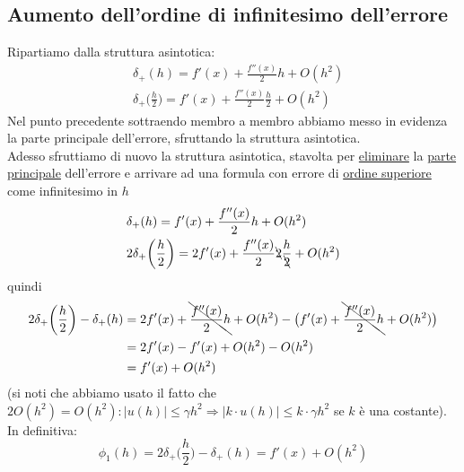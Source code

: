 \documentclass[12pt,a4paper]{article}
\begin{document}
\subsection{Aumento dell'ordine di infinitesimo dell'errore}
Ripartiamo dalla struttura asintotica:
\begin{equation*}
    \begin{split}
        & \delta_+(h) = f'(x) + \frac{f''(x)}{2}h + O(h^2) \\
        & \delta_+\biggl(\frac{h}{2}\biggr) = f'(x) + \frac{f''(x)}{2}\frac{h}{2} + O(h^2)
    \end{split}
\end{equation*}
Nel punto precedente sottraendo membro a membro abbiamo messo in evidenza la parte principale dell'errore, sfruttando la struttura asintotica.\\
Adesso sfruttiamo di nuovo la struttura asintotica, stavolta
per \uline{eliminare} la \uline{parte principale} dell'errore e arrivare ad una formula con errore di \uline{ordine superiore} come infinitesimo in $h$
\begin{equation*}
    \begin{split}
        & \delta_+(h) = f'(x) + \frac{f''(x)}{2}h + O(h^2) \\
        & 2\delta_+\biggl(\frac{h}{2}\biggr) = 2f'(x) + \frac{f''(x)}{2}\bcancel{2}\frac{h}{\bcancel{2}} + O(h^2)
    \end{split}
\end{equation*}
quindi
\begin{equation*}
    \begin{split}
        2\delta_+ \biggl(\frac{h}{2}\biggr) - \delta_+(h) & = 2f'(x)+\bcancel{\frac{f''(x)}{2}h} + O(h^2) - \bigl(f'(x) + \bcancel{\frac{f''(x)}{2}h} + O(h^2) \bigr) \\
        & = 2f'(x) - f'(x) + O(h^2) - O(h^2) \\
        & = f'(x)+O(h^2)
    \end{split}
\end{equation*}
(si noti che abbiamo usato il fatto che $2O(h^2) = O(h^2) : |u(h)|\leq\gamma h^2 \Rightarrow |k\cdot u(h)|\leq k\cdot\gamma h^2$ se $k$ è una costante).\\
In definitiva:
\begin{equation*}
    \phi_1(h) = 2\delta_+ \biggl(\frac{h}{2}\biggr) - \delta_+(h) = f'(x)+O(h^2)
\end{equation*}
\end{document}

